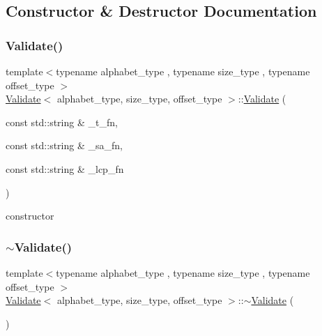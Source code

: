 \subsection{Constructor \& Destructor Documentation}
\mbox{\label{class_validate_a93b53c001ce92ccad38fe371e9df77b4}} 
\subsubsection{\texorpdfstring{Validate()}{Validate()}}
{\footnotesize\ttfamily template$<$typename alphabet\+\_\+type , typename size\+\_\+type , typename offset\+\_\+type $>$ \\
\hyperlink{class_validate}{Validate}$<$ alphabet\+\_\+type, size\+\_\+type, offset\+\_\+type $>$\+::\hyperlink{class_validate}{Validate} (\begin{DoxyParamCaption}\item[{const std\+::string \&}]{\+\_\+t\+\_\+fn,  }\item[{const std\+::string \&}]{\+\_\+sa\+\_\+fn,  }\item[{const std\+::string \&}]{\+\_\+lcp\+\_\+fn }\end{DoxyParamCaption})\hspace{0.3cm}{\ttfamily [inline]}}



constructor 

\mbox{\label{class_validate_a991e319d335c6f666f0058be4f73fc97}} 
\subsubsection{\texorpdfstring{$\sim$\+Validate()}{~Validate()}}
{\footnotesize\ttfamily template$<$typename alphabet\+\_\+type , typename size\+\_\+type , typename offset\+\_\+type $>$ \\
\hyperlink{class_validate}{Validate}$<$ alphabet\+\_\+type, size\+\_\+type, offset\+\_\+type $>$\+::$\sim$\hyperlink{class_validate}{Validate} (\begin{DoxyParamCaption}{ }\end{DoxyParamCaption})\hspace{0.3cm}{\ttfamily [inline]}}



